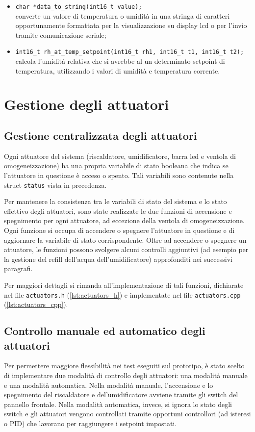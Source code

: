 \begin{itemize}
	\item \verb|char *data_to_string(int16_t value);| \label{data_to_string} \\
	converte un valore di temperatura o umidità in una stringa di caratteri opportunamente formattata per la visualizzazione
	su display lcd o per l'invio tramite comunicazione seriale;
	\item \verb|int16_t rh_at_temp_setpoint(int16_t rh1, int16_t t1, int16_t t2);| \\
	calcola l'umidità relativa che si avrebbe al un determinato setpoint di temperatura, utilizzando i valori di umidità
	e temperatura corrente.
\end{itemize}

\section{Gestione degli attuatori}
\subsection{Gestione centralizzata degli attuatori}
Ogni attuatore del sistema (riscaldatore, umidificatore, barra led e ventola di omogeneizzazione) ha una propria variabile
di stato booleana che indica se l'attuatore in questione è acceso o spento. Tali variabili sono contenute nella struct
\verb|status| vista in precedenza.

Per mantenere la consistenza tra le variabili di stato del sistema e lo stato effettivo degli attuatori, sono state realizzate
le due funzioni di accensione e spegnimento per ogni attuatore, ad eccezione della ventola di omogeneizzazione. Ogni funzione
si occupa di accendere o spegnere l'attuatore in questione e di aggiornare la variabile di stato corrispondente.
Oltre ad accendere o spegnere un attuatore, le funzioni possono svolgere alcuni controlli aggiuntivi (ad esempio per la
gestione del refill dell'acqua dell'umidificatore) approfonditi nei successivi paragrafi.

Per maggiori dettagli si rimanda all'implementazione di tali funzioni, dichiarate nel file \verb|actuators.h|
(\autoref{lst:actuators_h}) e implementate nel file \verb|actuators.cpp| (\autoref{lst:actuators_cpp}).

\subsection{Controllo manuale ed automatico degli attuatori}
Per permettere maggiore flessibilità nei test eseguiti sul prototipo, è stato scelto di implementare due modalità di controllo
degli attuatori: una modalità manuale e una modalità automatica. Nella modalità manuale, l'accensione e lo spegnimento del
riscaldatore e del'umidificatore avviene tramite gli switch del pannello frontale. Nella modalità automatica, invece, si ignora
lo stato degli switch e gli attuatori vengono controllati tramite opportuni controllori (ad isteresi o PID) che lavorano per
raggiungere i setpoint impostati.

